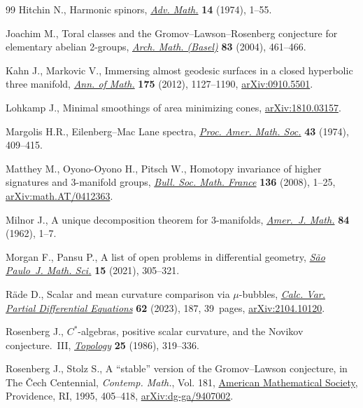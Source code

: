 \documentclass[pdftex]{sigma}
\numberwithin{equation}{section}
\begin{document}
\begin{thebibliography}{99}
Hitchin N., Harmonic spinors, \href{https://doi.org/10.1016/0001-8708(74)90021-8}{\textit{Adv. Math.}} \textbf{14} (1974), 1--55.

Joachim M., Toral classes and the {G}romov--{L}awson--{R}osenberg conjecture
 for elementary abelian 2-groups, \href{https://doi.org/10.1007/s00013-004-1080-5}{\textit{Arch. Math. (Basel)}} \textbf{83}
 (2004), 461--466.

Kahn J., Markovic V., Immersing almost geodesic surfaces in a closed hyperbolic
 three manifold, \href{https://doi.org/10.4007/annals.2012.175.3.4}{\textit{Ann. of Math.}} \textbf{175} (2012), 1127--1190,
 \href{https://arxiv.org/abs/0910.5501}{arXiv:0910.5501}.

Lohkamp J., Minimal smoothings of area minimizing cones, \href{https://arxiv.org/abs/1810.03157}{arXiv:1810.03157}.

Margolis H.R., Eilenberg--{M}ac {L}ane spectra, \href{https://doi.org/10.2307/2038905}{\textit{Proc. Amer. Math. Soc.}}
 \textbf{43} (1974), 409--415.

Matthey M., Oyono-Oyono H., Pitsch W., Homotopy invariance of higher signatures
 and 3-manifold groups, \href{https://doi.org/10.24033/bsmf.2547}{\textit{Bull. Soc. Math. France}} \textbf{136} (2008),
 1--25, \href{https://arxiv.org/abs/math.AT/0412363}{arXiv:math.AT/0412363}.

Milnor J., A unique decomposition theorem for 3-manifolds, \href{https://doi.org/10.2307/2372800}{\textit{Amer.~J.
 Math.}} \textbf{84} (1962), 1--7.

Morgan F., Pansu P., A list of open problems in differential geometry,
 \href{https://doi.org/10.1007/s40863-019-00141-8}{\textit{S\~ao Paulo~J. Math. Sci.}} \textbf{15} (2021), 305--321.

R\"ade D., Scalar and mean curvature comparison via {$\mu $}-bubbles,
 \href{https://doi.org/10.1007/s00526-023-02520-8}{\textit{Calc. Var. Partial Differential Equations}} \textbf{62} (2023), 187,
 39~pages, \href{https://arxiv.org/abs/2104.10120}{arXiv:2104.10120}.

Rosenberg J., {$C^\ast$}-algebras, positive scalar curvature, and the {N}ovikov
 conjecture.~{III}, \href{https://doi.org/10.1016/0040-9383(86)90047-9}{\textit{Topology}} \textbf{25} (1986), 319--336.

Rosenberg J., Stolz S., A ``stable'' version of the {G}romov--{L}awson
 conjecture, in The {\v{C}}ech {C}entennial, \textit{Contemp. Math.}, Vol.
 181, \href{https://doi.org/10.1090/conm/181/02046}{American Mathematical Society}, Providence, RI, 1995, 405--418,
 \href{https://arxiv.org/abs/dg-ga/9407002}{arXiv:dg-ga/9407002}.


\end{thebibliography}
\end{document}
